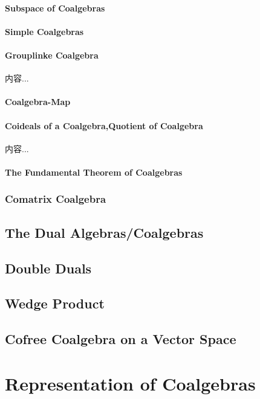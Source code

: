\documentclass[Total.tex]{subfiles}
\begin{document}
			\subsubsection{Subspace of Coalgebras}
			
			\subsubsection{Simple Coalgebras}
			
			\subsubsection{Grouplinke Coalgebra}
				\begin{Def}
					内容...
				\end{Def}
			\subsubsection{Coalgebra-Map}
			\subsubsection{Coideals of a Coalgebra,Quotient of Coalgebra}
			\begin{Def}
				内容...
			\end{Def}
			\subsubsection{The Fundamental Theorem of Coalgebras}
		\subsection{Comatrix Coalgebra}
		\section{The Dual Algebras/Coalgebras}
		\section{Double Duals}
		\section{Wedge Product}
		\section{Cofree Coalgebra on a Vector Space}
	\chapter{Representation of Coalgebras}
\end{document}
